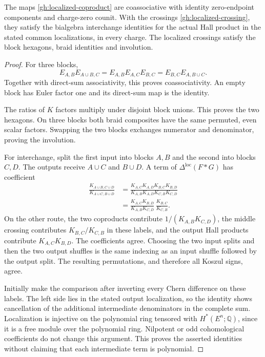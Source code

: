 \begin{proposition}\label{gh:localized-identities}
The maps \eqref{gh:localized-coproduct} are coassociative with
identity zero-endpoint components and charge-zero counit.
With the crossings \eqref{gh:localized-crossing}, they satisfy
the bialgebra interchange identities for the actual Hall product
in the stated common localizations, in every charge.
The localized crossings satisfy the block hexagons, braid
identities and involution.
\end{proposition}
\begin{proof}
For three blocks,
\[
 E_{A,B}E_{A\cup B,C}
 =E_{A,B}E_{A,C}E_{B,C}
 =E_{B,C}E_{A,B\cup C}.
\]
Together with direct-sum associativity, this proves coassociativity.
An empty block has Euler factor one and its direct-sum map is the
identity.

The ratios of $K$ factors multiply under disjoint block unions.
This proves the two hexagons. On three blocks both braid
composites have the same permuted, even scalar factors.
Swapping the two blocks exchanges numerator and denominator,
proving the involution.

For interchange, split the first input into blocks $A,B$ and the
second into blocks $C,D$. The outputs receive $A\cup C$ and
$B\cup D$. A term of
$\Delta^{\mathrm{loc}}(F*G)$ has coefficient
\[
 \begin{split}
 \frac{K_{A\cup B,C\cup D}}{K_{A\cup C,B\cup D}}
 &=\frac{K_{A,C}K_{A,D}K_{B,C}K_{B,D}}
         {K_{A,B}K_{A,D}K_{C,B}K_{C,D}}\\
 &=\frac{K_{A,C}K_{B,D}}{K_{A,B}K_{C,D}}\,
                           \frac{K_{B,C}}{K_{C,B}}.
 \end{split}
\]
On the other route, the two coproducts contribute
$1/(K_{A,B}K_{C,D})$, the middle crossing contributes
$K_{B,C}/K_{C,B}$ in these labels, and the output Hall products
contribute $K_{A,C}K_{B,D}$.
The coefficients agree.
Choosing the two input splits and then the two output shuffles
is the same indexing as an input shuffle followed by the output
split. The resulting permutations, and therefore all Koszul
signs, agree.

Initially make the comparison after inverting every Chern
difference on these labels. The left side lies in the stated
output localization, so the identity shows cancellation of the
additional intermediate denominators in the complete sum.
Localization is injective on the polynomial ring tensored with
$H^*(E^n;\mathbb Q)$, since it is a free module over the
polynomial ring. Nilpotent or odd cohomological coefficients do
not change this argument. This proves the asserted identities
without claiming that each intermediate term is polynomial.
\end{proof}

